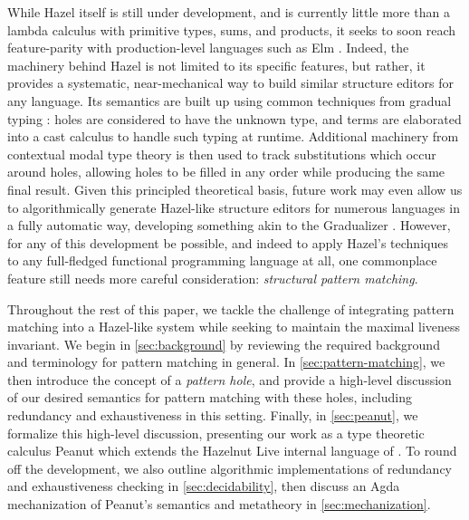 While Hazel itself is still under development, and is currently little more than a lambda calculus with primitive types, sums, and products, it seeks to soon reach feature-parity with production-level languages such as Elm \cite{DBLP:conf/pldi/CzaplickiC13, Elm, DBLP:journals/pacmpl/OmarVCH19}. Indeed, the machinery behind Hazel is not limited to its specific features, but rather, it provides a systematic, near-mechanical way to build similar structure editors for any language. Its semantics are built up using common techniques from gradual typing \cite{DBLP:conf/snapl/SiekVCB15}: holes are considered to have the unknown type, and terms are elaborated into a cast calculus to handle such typing at runtime. Additional machinery from contextual modal type theory \cite{DBLP:journals/tocl/NanevskiPP08} is then used to track substitutions which occur around holes, allowing holes to be filled in any order while producing the same final result. Given this principled theoretical basis, future work may even allow us to algorithmically generate Hazel-like structure editors for numerous languages in a fully automatic way, developing something akin to the Gradualizer \cite{DBLP:conf/popl/CiminiS16}. However, for any of this development be possible, and indeed to apply Hazel's techniques to any full-fledged functional programming language at all, one commonplace feature still needs more careful consideration: \emph{structural pattern matching}.

Throughout the rest of this paper, we tackle the challenge of integrating pattern matching into a Hazel-like system while seeking to maintain the maximal liveness invariant. We begin in \autoref{sec:background} by reviewing the required background and terminology for pattern matching in general. In \autoref{sec:pattern-matching}, we then introduce the concept of a \emph{pattern hole}, and provide a high-level discussion of our desired semantics for pattern matching with these holes, including redundancy and exhaustiveness in this setting. Finally,  in \autoref{sec:peanut}, we formalize this high-level discussion, presenting our work as a type theoretic calculus Peanut which extends the Hazelnut Live internal language 
of \cite{DBLP:journals/pacmpl/OmarVCH19}. To round off the development, we also outline algorithmic implementations of redundancy and exhaustiveness checking in \autoref{sec:decidability}, then discuss an Agda mechanization of Peanut's semantics and metatheory in \autoref{sec:mechanization}.
